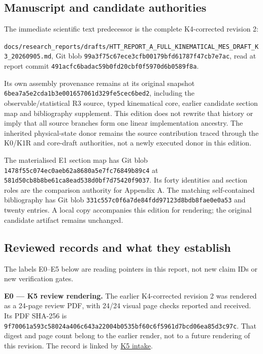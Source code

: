\documentclass[
  11pt,
  a4paper]{article}
\begin{document}
\hypertarget{b.1-manuscript-and-candidate-authorities}{%
\subsection{Manuscript and candidate authorities}\label{b.1-manuscript-and-candidate-authorities}}

The immediate scientific text predecessor is the complete K4-corrected revision 2:

{\ttfamily\nolinkurl{docs/research_reports/drafts/HTT_REPORT_A_FULL_KINEMATICAL_MES_DRAFT_K3_20260905.md}}, Git blob {\ttfamily\nolinkurl{99a3f75c67ece3cfb00179bfd61787f47cb7e7ac}}, read at report commit {\ttfamily\nolinkurl{491acfc6badac59b0fd20cbf0f5970d6b0589f8a}}.

Its own assembly provenance remains at its original snapshot {\ttfamily\nolinkurl{6bea7a5e2cda1b3e001657061d329fe5cec6bed2}}, including the observable/statistical R3 source, typed kinematical core, earlier candidate section map and bibliography supplement. This edition does not rewrite that history or imply that all source branches form one linear implementation ancestry. The inherited physical-state donor remains the source contribution traced through the K0/K1R and core-draft authorities, not a newly executed donor in this edition.

The materialised E1 section map has Git blob {\ttfamily\nolinkurl{1478f55c074ec0aeb62a8680a5e7fc76849b89c4}} at {\ttfamily\nolinkurl{581d50cb8b8be61ca8ead538d0bf7d75420f9037}}. Its forty identities and section roles are the comparison authority for Appendix A. The matching self-contained bibliography has Git blob {\ttfamily\nolinkurl{331c557c0f6a7de84fdd97123d8bdb8fae0e0a53}} and twenty entries. A local copy accompanies this edition for rendering; the original candidate artifact remains unchanged.

\hypertarget{b.2-reviewed-records-and-what-they-establish}{%
\subsection{Reviewed records and what they establish}\label{b.2-reviewed-records-and-what-they-establish}}

The labels E0--E5 below are reading pointers in this report, not new claim IDs or new verification gates.

\textbf{E0 --- K5 review rendering.} The earlier K4-corrected revision 2 was rendered as a 24-page review PDF, with 24/24 visual page checks reported and received. Its PDF SHA-256 is {\ttfamily\nolinkurl{9f70061a593c58024a406c643a22004b0535bf60c6f5961d7bcd06ea85d3c97c}}. That digest and page count belong to the earlier render, not to a future rendering of this revision. The record is linked by \href{https://github.com/cosmosapjw-quantum/htt_base/pull/449\#issuecomment-5549138545}{K5 intake}.
\end{document}
